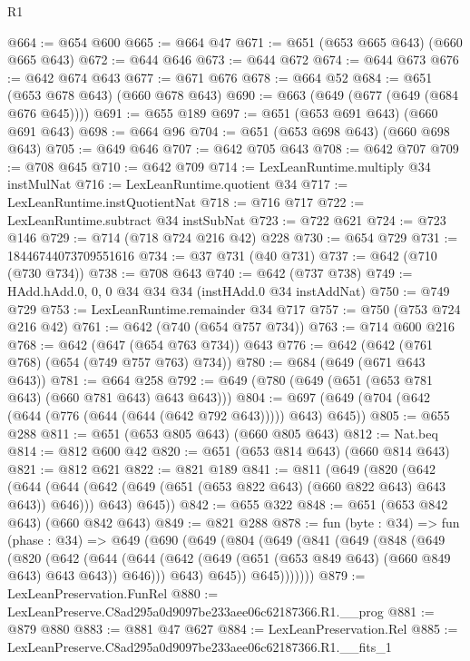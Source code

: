 \begin{lexlean}{R1}
\begin{coremodule}
@664 := @654 @600
@665 := @664 @47
@671 := @651 (@653 @665 @643) (@660 @665 @643)
@672 := @644 @646
@673 := @644 @672
@674 := @644 @673
@676 := @642 @674 @643
@677 := @671 @676
@678 := @664 @52
@684 := @651 (@653 @678 @643) (@660 @678 @643)
@690 := @663 (@649 (@677 (@649 (@684 @676 @645))))
@691 := @655 @189
@697 := @651 (@653 @691 @643) (@660 @691 @643)
@698 := @664 @96
@704 := @651 (@653 @698 @643) (@660 @698 @643)
@705 := @649 @646
@707 := @642 @705 @643
@708 := @642 @707
@709 := @708 @645
@710 := @642 @709
@714 := LexLeanRuntime.multiply @34 instMulNat
@716 := LexLeanRuntime.quotient @34
@717 := LexLeanRuntime.instQuotientNat
@718 := @716 @717
@722 := LexLeanRuntime.subtract @34 instSubNat
@723 := @722 @621
@724 := @723 @146
@729 := @714 (@718 @724 @216 @42) @228
@730 := @654 @729
@731 := 18446744073709551616
@734 := @37 @731 (@40 @731)
@737 := @642 (@710 (@730 @734))
@738 := @708 @643
@740 := @642 (@737 @738)
@749 := HAdd.hAdd.{0, 0, 0} @34 @34 @34 (instHAdd.{0} @34 instAddNat)
@750 := @749 @729
@753 := LexLeanRuntime.remainder @34 @717
@757 := @750 (@753 @724 @216 @42)
@761 := @642 (@740 (@654 @757 @734))
@763 := @714 @600 @216
@768 := @642 (@647 (@654 @763 @734)) @643
@776 := @642 (@642 (@761 @768) (@654 (@749 @757 @763) @734))
@780 := @684 (@649 (@671 @643 @643))
@781 := @664 @258
@792 := @649 (@780 (@649 (@651 (@653 @781 @643) (@660 @781 @643) @643 @643)))
@804 := @697 (@649 (@704 (@642 (@644 (@776 (@644 (@644 (@642 @792 @643))))) @643) @645))
@805 := @655 @288
@811 := @651 (@653 @805 @643) (@660 @805 @643)
@812 := Nat.beq
@814 := @812 @600 @42
@820 := @651 (@653 @814 @643) (@660 @814 @643)
@821 := @812 @621
@822 := @821 @189
@841 := @811
    (@649
      (@820
        (@642
          (@644 (@644 (@642 (@649 (@651 (@653 @822 @643) (@660 @822 @643) @643 @643)) @646)))
          @643)
        @645))
@842 := @655 @322
@848 := @651 (@653 @842 @643) (@660 @842 @643)
@849 := @821 @288
@878 := fun (byte : @34) =>
  fun (phase : @34) =>
  @649
    (@690
      (@649
        (@804
          (@649
            (@841
              (@649
                (@848
                  (@649
                    (@820
                      (@642
                        (@644
                          (@644
                            (@642 (@649 (@651 (@653 @849 @643) (@660 @849 @643) @643 @643)) @646)))
                        @643)
                      @645))
                  @645)))))))
@879 := LexLeanPreservation.FunRel
@880 := LexLeanPreserve.C8ad295a0d9097be233aee06c62187366.R1.__prog
@881 := @879 @880
@883 := @881 @47 @627
@884 := LexLeanPreservation.Rel
@885 := LexLeanPreserve.C8ad295a0d9097be233aee06c62187366.R1.__fits_1

\end{coremodule}
\end{lexlean}
